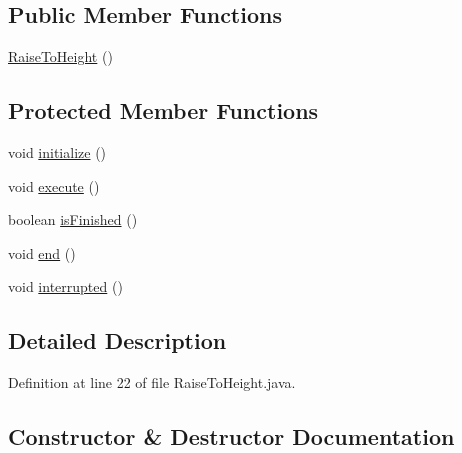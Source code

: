 \subsection*{Public Member Functions}
\begin{DoxyCompactItemize}
\item 
\mbox{\hyperlink{classorg_1_1usfirst_1_1frc3707_1_1_creedence_1_1commands_1_1_raise_to_height_a2e5c46789c31e618b31cc96b3d4bd1a4}{Raise\+To\+Height}} ()
\end{DoxyCompactItemize}
\subsection*{Protected Member Functions}
\begin{DoxyCompactItemize}
\item 
void \mbox{\hyperlink{classorg_1_1usfirst_1_1frc3707_1_1_creedence_1_1commands_1_1_raise_to_height_a905386a14dd3e41d68c54f42770d82db}{initialize}} ()
\item 
void \mbox{\hyperlink{classorg_1_1usfirst_1_1frc3707_1_1_creedence_1_1commands_1_1_raise_to_height_ab4c3b6b91e45d50ac03307ef65693daf}{execute}} ()
\item 
boolean \mbox{\hyperlink{classorg_1_1usfirst_1_1frc3707_1_1_creedence_1_1commands_1_1_raise_to_height_ae72d4c6f4c3a965e560f20b2db7c3eb7}{is\+Finished}} ()
\item 
void \mbox{\hyperlink{classorg_1_1usfirst_1_1frc3707_1_1_creedence_1_1commands_1_1_raise_to_height_a8d093371f707b89a0d600097a1ec598f}{end}} ()
\item 
void \mbox{\hyperlink{classorg_1_1usfirst_1_1frc3707_1_1_creedence_1_1commands_1_1_raise_to_height_a3dac52447690429a37264c0fdfd9b3ab}{interrupted}} ()
\end{DoxyCompactItemize}


\subsection{Detailed Description}


Definition at line 22 of file Raise\+To\+Height.\+java.



\subsection{Constructor \& Destructor Documentation}
\mbox{\label{classorg_1_1usfirst_1_1frc3707_1_1_creedence_1_1commands_1_1_raise_to_height_a2e5c46789c31e618b31cc96b3d4bd1a4}} 
